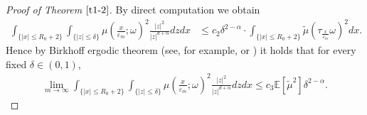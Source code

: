 \documentclass[11pt,draft, reqno]{amsart}
\renewcommand{\le}{\leqslant}
\newcommand{\e}{\varepsilon}
\newcommand{\Ee}{\mathds E}
\newcommand{\w}{\omega}
\theoremstyle{definition}
\numberwithin{equation}{section}
\begin{document}
\begin{proof} [Proof of Theorem $\ref{t1-2}$]
By direct computation we obtain
\begin{align*}
\int_{\{|x|\le R_0+2\}}\int_{\{|z|\le \delta\}}
\mu\left(\frac{x}{\e_m};\w\right)^2\frac{|z|^2}{|z|^{d+\alpha}}dzdx&\le
c_2\delta^{2-\alpha}\cdot \int_{\{|x|\le R_0+2\}}\tilde \mu\left(\tau_\frac{x}{\e_m}\w\right)^2dx.
\end{align*}
Hence by Birkhoff ergodic theorem (see, for example, \cite[Proposition 2.1]{CCKW1} or \cite[Theorem 7.2]{JKO}) it holds that for every fixed $\delta\in (0,1)$,
\begin{align*}
\lim_{m \to \infty}\int_{\{|x|\le R_0+2\}}\int_{\{|z|\le \delta\}}
\mu\left(\frac{x}{\e_m};\w\right)^2\frac{|z|^2}{|z|^{d+\alpha}}dzdx \le c_3\Ee[\tilde \mu^2]\delta^{2-\alpha}.
\end{align*}




\end{proof}
\end{document}
